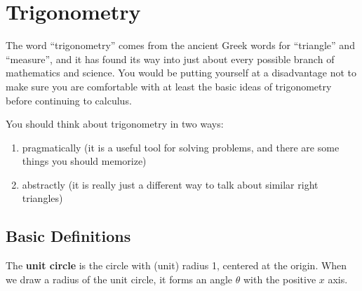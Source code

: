 \documentclass{article}
\theoremstyle{definition}
\theoremstyle{definition}
\begin{document}
\section{Trigonometry}

The word ``trigonometry'' comes from the ancient Greek words for ``triangle'' and ``measure'', and it has found its way into just about every possible branch of mathematics and science. You would be putting yourself at a disadvantage not to make sure you are comfortable with at least the basic ideas of trigonometry before continuing to calculus.

You should think about trigonometry in two ways:
\begin{enumerate}
\item pragmatically (it is a useful tool for solving problems, and there are some things you should memorize)
\item abstractly (it is really just a different way to talk about similar right triangles)
\end{enumerate}

\subsection{Basic Definitions}
The \textbf{unit circle} is the circle with (unit) radius 1, centered at the origin. When we draw a radius of the unit circle, it forms an angle $\theta$ with the positive $x$ axis.
\end{document}

